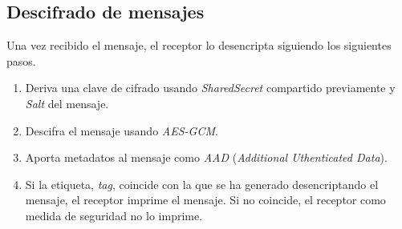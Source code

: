 \subsection{Descifrado de mensajes}
Una vez recibido el mensaje, el receptor lo desencripta siguiendo los siguientes pasos.
\begin{enumerate}
	\item Deriva una clave de cifrado usando \emph{SharedSecret} compartido previamente y \emph{Salt} del mensaje.
	\item Descifra el mensaje usando \emph{AES-GCM}.
	\item Aporta metadatos al mensaje como \emph{AAD} (\emph{Additional Uthenticated Data}).
	\item Si la etiqueta, \emph{tag}, coincide con la que se ha generado desencriptando el mensaje, el receptor imprime el mensaje. Si no coincide, el receptor como medida de seguridad no lo imprime.
\end{enumerate}

